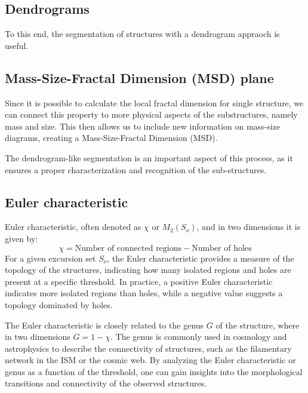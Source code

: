 \subsection{Dendrograms}

To this end, the segmentation of structures with a dendrogram appraoch is useful.

\subsection{Mass-Size-Fractal Dimension (MSD) plane}

Since it is possible to calculate the local fractal dimension for single structure, we can connect this property to more physical aspects of the substructures, namely mass and size. This then allows us to include new information on mass-size diagrams, creating a Mass-Size-Fractal Dimension (MSD).

The dendrogram-like segmentation is an important aspect of this process, as it ensures a proper characterization and recognition of the sub-structures. 


\subsection{Euler characteristic}

Euler characteristic, often denoted as $\chi$ or $M_2(S_{\nu})$, and in two dimensions it is given by:
\begin{equation}
    \chi = \text{Number of connected regions} - \text{Number of holes}
\end{equation}
For a given excursion set $S_{\nu}$, the Euler characteristic provides a measure of the topology of the structures, indicating how many isolated regions and holes are present at a specific threshold. In practice, a positive Euler characteristic indicates more isolated regions than holes, while a negative value suggests a topology dominated by holes.

The Euler characteristic is closely related to the genus $G$ of the structure, where in two dimensions $G = 1 - \chi$. The genus is commonly used in cosmology and astrophysics to describe the connectivity of structures, such as the filamentary network in the ISM or the cosmic web. By analyzing the Euler characteristic or genus as a function of the threshold, one can gain insights into the morphological transitions and connectivity of the observed structures.


